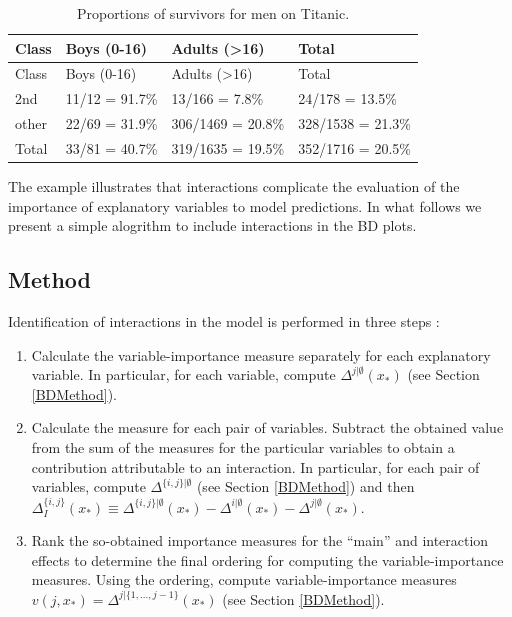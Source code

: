 \documentclass[12pt,]{krantz}
\providecommand{\tightlist}{%
  \setlength{\itemsep}{0pt}\setlength{\parskip}{0pt}}
\begin{document}
\begin{longtable}[]{@{}llll@{}}
\caption{\label{tab:titanicMaleSurvival} Proportions of survivors for men on Titanic.}\tabularnewline
\toprule
Class & Boys (0-16) & Adults (\textgreater{}16) & Total\tabularnewline
\midrule
\endfirsthead
\toprule
Class & Boys (0-16) & Adults (\textgreater{}16) & Total\tabularnewline
\midrule
\endhead
2nd & 11/12 = 91.7\% & 13/166 = 7.8\% & 24/178 = 13.5\%\tabularnewline
other & 22/69 = 31.9\% & 306/1469 = 20.8\% & 328/1538 = 21.3\%\tabularnewline
Total & 33/81 = 40.7\% & 319/1635 = 19.5\% & 352/1716 = 20.5\%\tabularnewline
\bottomrule
\end{longtable}

The example illustrates that interactions complicate the evaluation of the importance of explanatory variables to model predictions. In what follows we present a simple alogrithm to include interactions in the BD plots.

\hypertarget{iBDMethod}{%
\subsection{Method}\label{iBDMethod}}

Identification of interactions in the model is performed in three steps \citep{iBreakDownRPackage}:

\begin{enumerate}
\def\labelenumi{\arabic{enumi}.}
\tightlist
\item
  Calculate the variable-importance measure separately for each explanatory variable. In particular, for each variable, compute \(\Delta^{j|\emptyset}(x_*)\) (see Section \ref{BDMethod}).
\item
  Calculate the measure for each pair of variables. Subtract the obtained value from the sum of the measures for the particular variables to obtain a contribution attributable to an interaction. In particular, for each pair of variables, compute \(\Delta^{\{i,j\}|\emptyset}\) (see Section \ref{BDMethod}) and then \(\Delta^{\{i,j\}}_I(x_*) \equiv \Delta^{\{i,j\}|\emptyset}(x_*)-\Delta^{i|\emptyset}(x_*)-\Delta^{j|\emptyset}(x_*)\).
\item
  Rank the so-obtained importance measures for the ``main'' and interaction effects to determine the final ordering for computing the variable-importance measures. Using the ordering, compute variable-importance measures \(v(j, x_*) = \Delta^{j|\{1, ..., j-1\}}(x_*)\) (see Section \ref{BDMethod}).
\end{enumerate}
\end{document}

